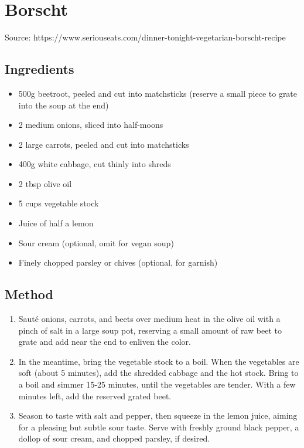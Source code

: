 \clearpage
\section{Borscht}


Source: https://www.seriouseats.com/dinner-tonight-vegetarian-borscht-recipe

\subsection{Ingredients}

\begin{itemize}
    \item 500g beetroot, peeled and cut into matchsticks (reserve a small piece to grate into the soup at the end)
    \item 2 medium onions, sliced into half-moons
    \item 2 large carrots, peeled and cut into matchsticks
    \item 400g white cabbage, cut thinly into shreds
    \item 2 tbsp olive oil
    \item 5 cups vegetable stock
    \item Juice of half a lemon
    \item Sour cream (optional, omit for vegan soup)
    \item Finely chopped parsley or chives (optional, for garnish)
\end{itemize}

\subsection{Method}

\begin{enumerate}
    \item Sauté onions, carrots, and beets over medium heat in the olive oil with a pinch of salt in a large soup pot, reserving a small amount of raw beet to grate and add near the end to enliven the color.
    \item In the meantime, bring the vegetable stock to a boil. When the vegetables are soft (about 5 minutes), add the shredded cabbage and the hot stock. Bring to a boil and simmer 15-25 minutes, until the vegetables are tender. With a few minutes left, add the reserved grated beet.    
    \item Season to taste with salt and pepper, then squeeze in the lemon juice, aiming for a pleasing but subtle sour taste. Serve with freshly ground black pepper, a dollop of sour cream, and chopped parsley, if desired.
\end{enumerate}
